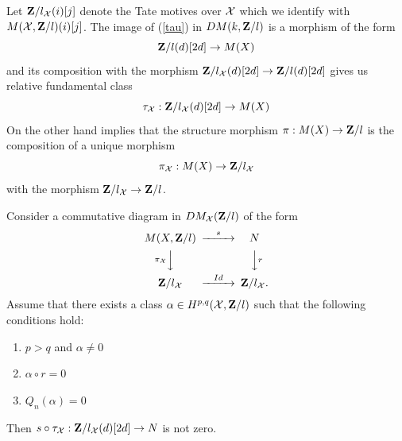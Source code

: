 \documentclass[11pt]{article}
\begin{document}
Let ${\bf Z\rm}/l_{\cal X}(i)[j]$ denote the Tate motives over $\cal X$ which
we identify with $M({\cal X},{\bf Z\rm}/l)(i)[j]$. The image of (\ref{tau}) in
$DM(k,{\bf Z\rm}/l)$ is a morphism of the form
%
$${\bf Z\rm}/l(d)[2d]\rightarrow M(X)$$
%
and its composition with the morphism ${\bf Z\rm}/l_{\cal X}(d)[2d]\rightarrow
{\bf Z\rm}/l(d)[2d]$ gives us relative fundamental class
%
%
$$\tau_{\cal X}:{\bf Z\rm}/l_{\cal X}(d)[2d]\rightarrow M(X)$$
%
On the other hand  implies that the structure morphism
$\pi:M(X)\rightarrow {\bf Z\rm}/l$ is the composition of a unique morphism
%
$$\pi_{\cal X}:M(X)\rightarrow {\bf Z\rm}/l_{\cal X}$$
%
with the morphism ${\bf Z\rm}/l_{\cal X}\rightarrow {\bf Z\rm}/l$.
%
\begin{theorem}
 Consider a commutative diagram in $DM_{\cal X}({\bf Z\rm}/l)$
of the form
%
$$
\begin{CD}
M(X,\zz/l) @>s>> N\\
@V\pi_{\cal X}VV @VVrV\\
\zz/l_{\cal X} @>Id>> \zz/l_{\cal X}.
\end{CD}
$$
%
Assume that there exists a class $\alpha\in H^{p,q}({\cal X},{\bf Z\rm}/l)$
such that the following conditions hold:
%
\begin{enumerate}
\item $p>q$ and $\alpha\ne 0$
\item $\alpha\circ r=0$
\item $Q_n(\alpha)=0$
\end{enumerate}
%
Then $s\circ \tau_{\cal X}:{\bf Z\rm}/l_{\cal X}(d)[2d]\rightarrow N$ is not zero.
\end{theorem}
%
\end{document}
